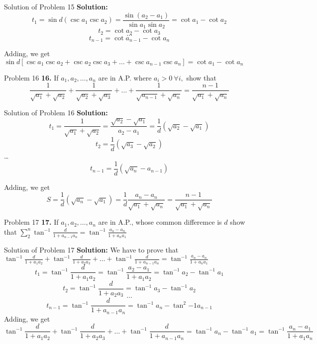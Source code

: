 \documentclass[aspectratio=1610,8pt]{beamer}
\begin{document}
\begin{frame}{Solution of Problem 15}
  \textbf{Solution:}$$t_1 = \sin d(\csc a_1\csc a_2) = \frac{\sin(a_2 - a_1)}{\sin a_1\sin a_2} = \cot a_1 - \cot a_2$$
  $$t_2 = \cot a_2 - \cot a_3$$
  $$\ldots$$
  $$t_{n - 1} = \cot a_{n - 1} - \cot a_n$$

  Adding, we get $\sin d[\csc a_1\csc a_2 + \csc a_2\csc a_3 + \ldots + \csc a_{n - 1}\csc a_n] = \cot a_1 - \cot a_n$
\end{frame}
\begin{frame}{Problem 16}
  \textbf{16.} If $a_1, a_2, \ldots, a_n$ are in A.P. where $a_i > 0~\forall i,$ show that $$\frac{1}{\sqrt{a_1} + \sqrt{a_2}} +
  \frac{1}{\sqrt{a_2} + \sqrt{a_3}} + \ldots + \frac{1}{\sqrt{a_{n - 1}} + \sqrt{a_n}} = \frac{n - 1}{\sqrt{a_1} + \sqrt{a_n}}$$
\end{frame}
\begin{frame}{Solution of Problem 16}
  \textbf{Solution:} $$t_1 = \frac{1}{\sqrt{a_1} + \sqrt{a_2}} = \frac{\sqrt{a_2} - \sqrt{a_1}}{a_2 - a_1} =
  \frac{1}{d}(\sqrt{a_2} - \sqrt{a_1})$$
  $$t_2 = \frac{1}{d}(\sqrt{a_3} - \sqrt{a_2})$$
  \ldots
  $$t_{n - 1} = \frac{1}{d}(\sqrt{a_n} - a_{n - 1})$$

  Adding, we get $$S = \frac{1}{d}(\sqrt{a_n} - \sqrt{a_1}) = \frac{1}{d}\frac{a_n - a_n}{\sqrt{a_1} + \sqrt{a_n}} = \frac{n -
    1}{\sqrt{a_1} + \sqrt{a_n}}$$
\end{frame}
\begin{frame}{Problem 17}
  \textbf{17.} If $a_1, a_2, \ldots, a_n$ are in A.P., whose common differemce is $d$ show that $\sum_{2}^n\tan^{-1}\frac{d}{1 +
    a_{n - 1}a_n} = \tan^{-1}\frac{a_n - a_n}{1 + a_na_1}$
\end{frame}
\begin{frame}{Solution of Problem 17}
  \textbf{Solution:} We have to prove that $\tan^{-1}\frac{d}{1 + a_1a_2} + \tan^{-1}\frac{d}{1 + a_2a_3} + \ldots +
  \tan^{-1}\frac{d}{1 + a_{n - 1}a_n} = \tan^{-1}\frac{a_n - a_n}{1 + a_na_1}$
  $$t_1 = \tan^{-1}\frac{d}{1 + a_1a_2} = \tan^{-1}\frac{a_2 - a_1}{1 + a_1a_2} = \tan^{-1}a_2 - \tan^{-1}a_1$$
  $$t_2 = \tan^{-1}\frac{d}{1 + a_2a_3} = \tan^{-1}a_3 - \tan^{-1}a_2$$
  $$\ldots$$
  $$t_{n - 1} = \tan^{-1}\frac{d}{1 + a_{n - 1}a_n} = \tan^{-1}a_{n} - \tan^2{-1}a_{n - 1}$$
  Adding, we get
  $$\tan^{-1}\frac{d}{1 + a_1a_2} + \tan^{-1}\frac{d}{1 + a_2a_3} + \ldots + \tan^{-1}\frac{d}{1 + a_{n - 1}a_n} = \tan^{-1}a_n -
  \tan^{-1}a_1 = \tan^{-1}\frac{a_n - a_1}{1 + a_1a_n}$$
\end{frame}
\end{document}
